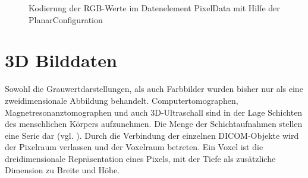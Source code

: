 \begin{figure}[htb]
\centering
{}
\caption{Kodierung der RGB-Werte im Datenelement PixelData mit Hilfe der PlanarConfiguration}
\label{planar}
\end{figure}

\section{3D Bilddaten}
Sowohl die Grauwertdarstellungen, als auch Farbbilder wurden bisher nur als eine zweidimensionale Abbildung behandelt. Computertomographen, Magnetresonanztomographen und auch 3D-Ultraschall sind in der Lage Schichten des menschlichen Körpers aufzunehmen. Die Menge der Schichtaufnahmen stellen eine Serie dar (vgl. \pageref{grundlagen:iod}). Durch die Verbindung der einzelnen DICOM-Objekte wird der Pixelraum verlassen und der Voxelraum betreten. Ein Voxel ist die dreidimensionale Repräsentation eines Pixels, mit der Tiefe als zusätzliche Dimension zu Breite und Höhe.

